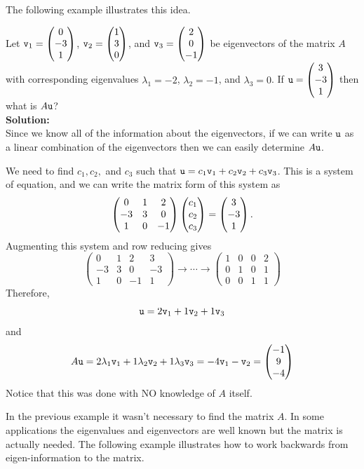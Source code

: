 The following example illustrates this idea.
\begin{example}
Let $\texttt{v}_1 = \begin{pmatrix} 0 \\ -3 \\ 1 \end{pmatrix}$, $\texttt{v}_2 = \begin{pmatrix} 1 \\ 3 \\ 0 \end{pmatrix}$, and $\texttt{v}_3 = \begin{pmatrix} 2
\\ 0 \\ -1 \end{pmatrix}$ be eigenvectors of the matrix $A$ with corresponding eigenvalues
$\lambda_1 = -2$, $\lambda_2 = -1$, and $\lambda_3 = 0$.  
If $\texttt{u} = \begin{pmatrix} 3 \\ -3 \\ 1 \end{pmatrix}$ then what is $A\texttt{u}$?
\\{\bf Solution:} \\
Since we know all of the information about the eigenvectors, if we can write $\texttt{u}$ as a
linear combination of the eigenvectors then we can easily determine $A\texttt{u}$.  

We need to find $c_1, c_2,$ and $c_3$ such that $\texttt{u} = c_1 \texttt{v}_1 + c_2 \texttt{v}_2 + c_3 \texttt{v}_3$.
This is a system of equation, and we can write the matrix form of this system as
\[ \begin{pmatrix} 0 & 1 & 2 \\ -3 & 3 & 0 \\ 1 & 0 & -1 \end{pmatrix} \begin{pmatrix} c_1 \\ c_2 \\ c_3 \end{pmatrix} = \begin{pmatrix} 3 \\
    -3 \\ 1 \end{pmatrix}. \]
Augmenting this system and row reducing gives
\[ \left( \begin{array}{ccc|c} 0 & 1 & 2 & 3 \\ -3 & 3 & 0 & -3 \\ 1 & 0 & -1 & 1
    \end{array} \right) \to \cdots \to \left( \begin{array}{ccc|c} 1 & 0 & 0 & 2 \\ 0 & 1
        & 0 & 1 \\ 0 & 0 & 1 & 1 \end{array} \right) \]
Therefore, 
\[ \texttt{u} = 2 \texttt{v}_1 + 1\texttt{v}_2 + 1 \texttt{v}_3 \]
and 
\[ A\texttt{u} = 2 \lambda_1 \texttt{v}_1 + 1 \lambda_2 \texttt{v}_2 + 1 \lambda_3 \texttt{v}_3 = -4 \texttt{v}_1 - \texttt{v}_2 =
    \begin{pmatrix} -1 \\ 9 \\ -4 \end{pmatrix} \]
Notice that this was done with NO knowledge of $A$ itself.
\end{example}


In the previous example it wasn't necessary to find the matrix $A$.  In some applications
the eigenvalues and eigenvectors are well known but the matrix is actually needed.  The
following example illustrates how to work backwards from eigen-information to the matrix.

